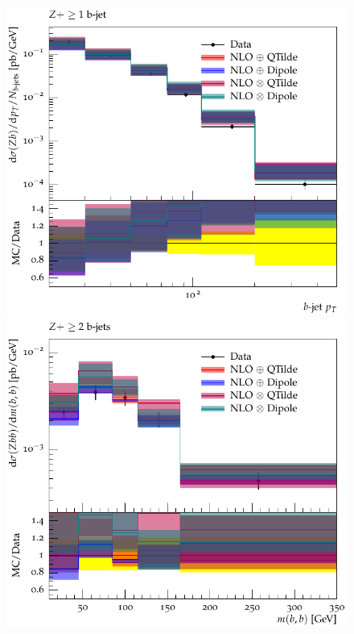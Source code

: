 \documentclass[11pt]{cernrep} \usepackage{graphicx,epsfig} 
\begin{document}
\begin{figure}[htbp]
\begin{center}
   \includegraphics[scale=0.65]{figs/zbb/herwigzbb/d03-x01-y01.pdf} 
   \includegraphics[scale=0.65]{figs/zbb/herwigzbb/d23-x01-y01.pdf} \\

\end{center}
\end{figure}
\end{document}
